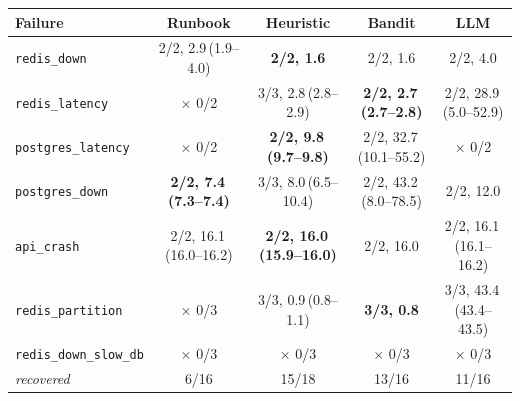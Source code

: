\begin{tabular}{@{}lcccc@{}}
\toprule
Failure & Runbook & Heuristic & Bandit & LLM \\
\midrule
\texttt{redis\_down} & 2/2, 2.9\,{\scriptsize(1.9--4.0)} & \textbf{2/2, 1.6} & 2/2, 1.6 & 2/2, 4.0 \\
\texttt{redis\_latency} & $\times$ 0/2 & 3/3, 2.8\,{\scriptsize(2.8--2.9)} & \textbf{2/2, 2.7\,{\scriptsize(2.7--2.8)}} & 2/2, 28.9\,{\scriptsize(5.0--52.9)} \\
\texttt{postgres\_latency} & $\times$ 0/2 & \textbf{2/2, 9.8\,{\scriptsize(9.7--9.8)}} & 2/2, 32.7\,{\scriptsize(10.1--55.2)} & $\times$ 0/2 \\
\texttt{postgres\_down} & \textbf{2/2, 7.4\,{\scriptsize(7.3--7.4)}} & 3/3, 8.0\,{\scriptsize(6.5--10.4)} & 2/2, 43.2\,{\scriptsize(8.0--78.5)} & 2/2, 12.0 \\
\texttt{api\_crash} & 2/2, 16.1\,{\scriptsize(16.0--16.2)} & \textbf{2/2, 16.0\,{\scriptsize(15.9--16.0)}} & 2/2, 16.0 & 2/2, 16.1\,{\scriptsize(16.1--16.2)} \\
\midrule
\texttt{redis\_partition} & $\times$ 0/3 & 3/3, 0.9\,{\scriptsize(0.8--1.1)} & \textbf{3/3, 0.8} & 3/3, 43.4\,{\scriptsize(43.4--43.5)} \\
\texttt{redis\_down\_slow\_db} & $\times$ 0/3 & $\times$ 0/3 & $\times$ 0/3 & $\times$ 0/3 \\
\midrule
\textit{recovered} & 6/16 & 15/18 & 13/16 & 11/16 \\
\bottomrule
\end{tabular}